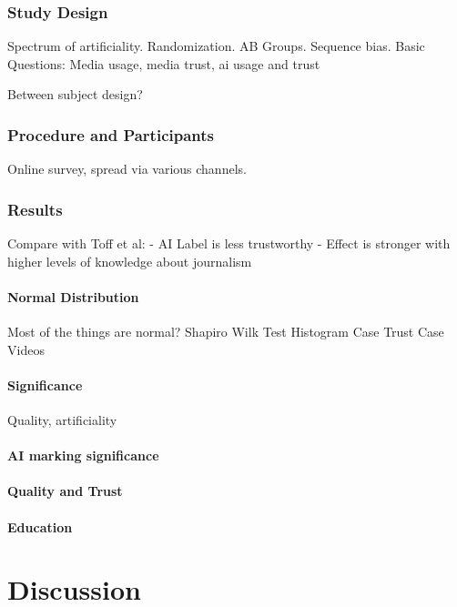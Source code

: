 \documentclass[
  a4paper,  %
  twoside,  %
  bibliography=totoc,
  headsepline,
  cleardoublepage=empty,
  parskip=half,
  draft=false
]{scrbook}
\begin{document}
\label{study}
\subsection{Study Design}
\label{subsec:study design}
Spectrum of artificiality.
Randomization.
AB Groups. 
Sequence bias.
Basic Questions: Media usage, media trust, ai usage and trust

Between subject design? 

\subsection{Procedure and Participants}
Online survey, spread via various channels.

\subsection{Results}

Compare with Toff et al: 
- AI Label is less trustworthy
- Effect is stronger with higher levels of knowledge about journalism


\subsubsection{Normal Distribution}
Most of the things are normal?
Shapiro Wilk Test
Histogram
Case Trust
Case Videos

\subsubsection{Significance}
Quality, artificiality

\subsubsection{AI marking significance}

\subsubsection{Quality and Trust}

\subsubsection{Education}







\chapter{Discussion}
\end{document}
